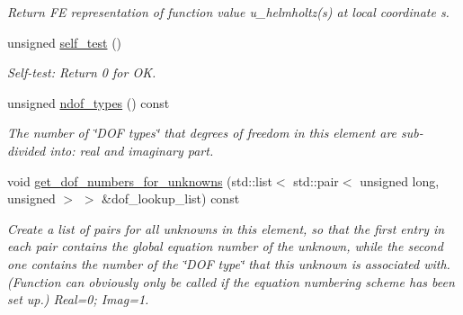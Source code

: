 \begin{DoxyCompactItemize}
\begin{DoxyCompactList}\small\item\em Return FE representation of function value u\+\_\+helmholtz(s) at local coordinate s. \end{DoxyCompactList}\item 
unsigned \hyperlink{classoomph_1_1PMLHelmholtzEquationsBase_a92b8b911dde0f9ece84d1b06a7b93936}{self\+\_\+test} ()
\begin{DoxyCompactList}\small\item\em Self-\/test\+: Return 0 for OK. \end{DoxyCompactList}\item 
unsigned \hyperlink{classoomph_1_1PMLHelmholtzEquationsBase_ab061223c28ff7ee0c3423bcabc543161}{ndof\+\_\+types} () const
\begin{DoxyCompactList}\small\item\em The number of \char`\"{}\+D\+O\+F types\char`\"{} that degrees of freedom in this element are sub-\/divided into\+: real and imaginary part. \end{DoxyCompactList}\item 
void \hyperlink{classoomph_1_1PMLHelmholtzEquationsBase_a5a398f15e17d34ae45b571fb9a53a1c1}{get\+\_\+dof\+\_\+numbers\+\_\+for\+\_\+unknowns} (std\+::list$<$ std\+::pair$<$ unsigned long, unsigned $>$ $>$ \&dof\+\_\+lookup\+\_\+list) const
\begin{DoxyCompactList}\small\item\em Create a list of pairs for all unknowns in this element, so that the first entry in each pair contains the global equation number of the unknown, while the second one contains the number of the \char`\"{}\+D\+O\+F type\char`\"{} that this unknown is associated with. (Function can obviously only be called if the equation numbering scheme has been set up.) Real=0; Imag=1. \end{DoxyCompactList}\end{DoxyCompactItemize}
